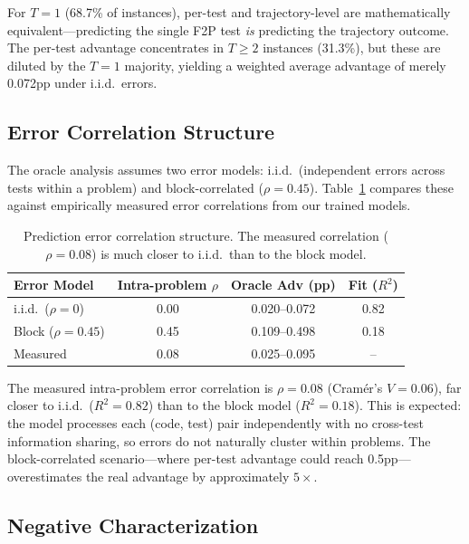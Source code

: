 \documentclass[11pt,a4paper]{article}
\begin{document}
For $T{=}1$ (68.7\% of instances), per-test and trajectory-level are mathematically equivalent---predicting the single F2P test \emph{is} predicting the trajectory outcome.
The per-test advantage concentrates in $T{\geq}2$ instances (31.3\%), but these are diluted by the $T{=}1$ majority, yielding a weighted average advantage of merely 0.072pp under i.i.d.\ errors.

\subsection{Error Correlation Structure}

The oracle analysis assumes two error models: i.i.d.\ (independent errors across tests within a problem) and block-correlated ($\rho{=}0.45$).
Table~\ref{tab:correlation} compares these against empirically measured error correlations from our trained models.

\begin{table}[t]
\centering
\small
\caption{Prediction error correlation structure. The measured correlation ($\rho{=}0.08$) is much closer to i.i.d.\ than to the block model.}
\label{tab:correlation}
\begin{tabular}{lccc}
\toprule
\textbf{Error Model} & \textbf{Intra-problem $\rho$} & \textbf{Oracle Adv (pp)} & \textbf{Fit ($R^2$)} \\
\midrule
i.i.d.\ ($\rho{=}0$) & 0.00 & 0.020--0.072 & 0.82 \\
Block ($\rho{=}0.45$) & 0.45 & 0.109--0.498 & 0.18 \\
Measured & 0.08 & 0.025--0.095 & -- \\
\bottomrule
\end{tabular}
\end{table}

The measured intra-problem error correlation is $\rho{=}0.08$ (Cram\'er's $V{=}0.06$), far closer to i.i.d.\ ($R^2{=}0.82$) than to the block model ($R^2{=}0.18$).
This is expected: the model processes each (code, test) pair independently with no cross-test information sharing, so errors do not naturally cluster within problems.
The block-correlated scenario---where per-test advantage could reach 0.5pp---overestimates the real advantage by approximately $5\times$.

\subsection{Negative Characterization}
\end{document}
